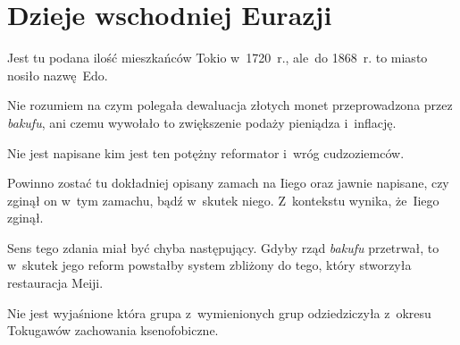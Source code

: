 \documentclass[a4paper,11pt]{article}
\begin{document}
\newpage
\section{Dzieje wschodniej Eurazji}

\vspace{\spaceTwo}







\start {} Jest tu podana ilość mieszkańców Tokio w~1720~r.,
ale~do 1868~r. to miasto nosiło nazwę~Edo.

\vspace{\spaceFour}



\start {} Nie rozumiem na czym polegała dewaluacja złotych monet
przeprowadzona przez \textit{bakufu}, ani czemu wywołało to zwiększenie
podaży pieniądza i~inflację.

\vspace{\spaceFour}



\start {} Nie jest napisane kim jest ten potężny
reformator i~wróg cudzoziemców.

\vspace{\spaceFour}



\start {} Powinno zostać tu dokładniej opisany zamach na Iiego
oraz jawnie napisane, czy zginął on w~tym zamachu, bądź w~skutek
niego. Z~kontekstu wynika, że~Iiego zginął.

\vspace{\spaceFour}



\start {} Sens tego zdania miał być chyba następujący. Gdyby
rząd \textit{bakufu} przetrwał, to w~skutek jego reform powstałby system
zbliżony do tego, który stworzyła restauracja Meiji.

\vspace{\spaceFour}



\start {} Nie jest wyjaśnione która grupa
z~wymienionych grup odziedziczyła z~okresu Tokugawów zachowania
ksenofobiczne.
\end{document}
